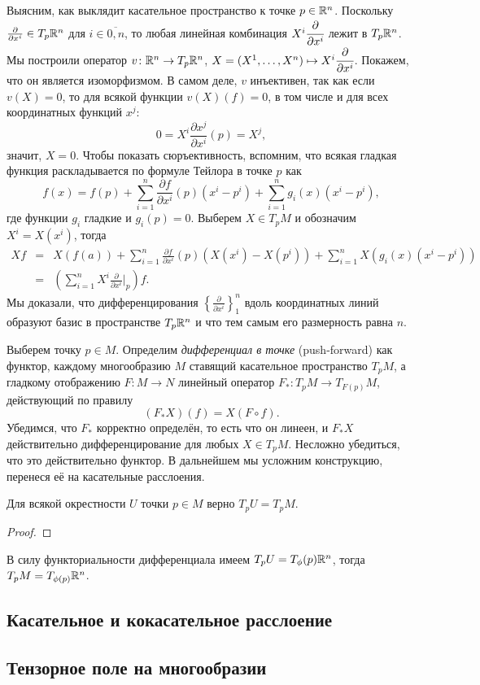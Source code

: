 
Выясним, как выклядит касательное пространство к точке $p\in\mathbb {R}^n$. Поскольку $\frac{\partial}{\partial x^i}\in T_p\mathbb {R}^n$ для $i\in\overline{0,n}$, то любая линейная комбинация $X^i\cfrac{\partial}{\partial x^i}$ лежит в $T_p\mathbb {R}^n$. Мы построили оператор $v\colon\mathbb {R}^n\to T_p\mathbb {R}^n$, $X=(X^1,\ldots,X^n)\mapsto X^i\cfrac{\partial}{\partial x^i}$. Покажем, что он является изоморфизмом. В самом деле, $v$ инъективен, так как если $v(X)=0$, то для всякой функции $v(X)(f)=0$, в том числе и для всех координатных функций $x^j$:
\begin{equation}
	0=X^i\frac{\partial x^j}{\partial x^i}(p)=X^j,
\end{equation}
значит, $X=0$. Чтобы показать сюръективность, вспомним, что всякая гладкая функция раскладывается по формуле Тейлора в точке $p$ как
\begin{equation*}
	f(x)=f(p)+\sum_{i=1}^n\frac{\partial f}{\partial x^i}(p)(x^i-p^i)+\sum_{i=1}^ng_i(x)(x^i-p^i),
\end{equation*}
где функции $g_i$ гладкие и $g_i(p)=0$. Выберем $X\in T_p M$ и обозначим $X^i=X(x^i)$, тогда
\begin{eqnarray*}
	Xf&=&X(f(a))+\sum_{i=1}^n\frac{\partial f}{\partial x^i}(p)(X(x^i)-X(p^i))+\sum_{i=1}^{n}X(g_i(x)(x^i-p^i))\\
		&=&\left(\sum_{i=1}^{n} X^i\frac{\partial}{\partial x^i}\Big|_p\right)f.
\end{eqnarray*}	
Мы доказали, что дифференцирования $\left\{\frac{\partial}{\partial x^i}\right\}_1^n$ вдоль координатных линий образуют базис в пространстве $T_p\mathbb {R}^n$ и что тем самым его размерность равна $n$.

Выберем точку $p\in M$. Определим \textit{дифференциал в точке} (push-forward) как функтор, каждому многообразию $M$ ставящий касательное пространство $T_pM$, а гладкому отображению $F\colon M\to N$ линейный оператор $F_*\colon T_pM\to T_{F(p)}M$, действующий по правилу
\begin{equation}
	(F_*X)(f)=X(F\circ f).
\end{equation}
Убедимся, что $F_*$ корректно определён, то есть что он линеен, и $F_*X$ действительно дифференцирование для любых $X\in T_pM$.
Несложно убедиться, что это действительно функтор. В дальнейшем мы усложним конструкцию, перенеся её на касательные расслоения.
\begin{lem}
	Для всякой окрестности $U$ точки $p\in M$ верно $T_pU=T_pM$.
\end{lem}
\begin{proof}

\end{proof}
В силу функториальности дифференциала имеем $T_pU=T_\phi(p)\mathbb {R}^n$, тогда $T_pM=T_{\phi(p)}\mathbb {R}^n$.

\subsection{Касательное и кокасательное расслоение}
\subsection{Тензорное поле на многообразии}